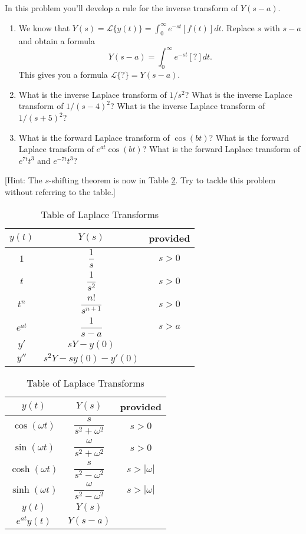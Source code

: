 \begin{problem}
 In this problem you'll develop a rule for the inverse transform of $Y(s-a)$. 
\begin{enumerate}
 \item  We know that $Y(s) = \mathscr{L}\{y(t)\} = \int_0^\infty e^{-st}[f(t)]dt$.  Replace $s$ with $s-a$ and obtain a formula
$$Y(s-a) = \int_0^\infty e^{-st}[?] dt.$$ This gives you a formula $\mathscr{L}\{?\} = Y(s-a)$.
 \item What is the inverse Laplace transform of $1/s^2$?  What is the inverse Laplace transform of $1/(s-4)^2$? What is the inverse Laplace transform of $1/(s+5)^2$?
 \item What is the forward Laplace transform of $\cos(bt)$? What is the forward Laplace transform of $e^{at} \cos (bt)$? What is the forward Laplace transform of $e^{7t}t^3$ and $e^{-7t}t^3$?
\end{enumerate}
[Hint: The $s$-shifting theorem is now in Table \ref{laplacetable2}.  Try to tackle this problem without referring to the table.]
\end{problem}

\begin{table}
\begin{center}
\begin{tabular}[t]{|c|cc|}
\hline
$y(t)$ & $Y(s)$ & provided\\
\hline\hline
$1$					&$\dfrac{1}{s}$ 							&$s>0$\\\hline
$t$				&$\dfrac{1}{s^{2}}$ 			&$s>0$\\\hline
$t^n$				&$\dfrac{n!}{s^{n+1}}$ 			&$s>0$\\\hline
$e^{at}$		&$\dfrac{1}{s-a}$ 			&$s>a$\\\hline
$y'$					&$sY-y(0)$ 						&\\\hline
$y''$					&$s^2Y-sy(0)-y'(0)$ 						&\\\hline
\end{tabular}
\quad
\begin{tabular}[t]{|c|cc|}
\hline
$y(t)$ & $Y(s)$ & provided\\
\hline\hline
$\cos(\omega t)$  &$\dfrac{s}{s^2+\omega^2}$ 			&$s>0$\\\hline
$\sin(\omega t)$  &$\dfrac{\omega}{s^2+\omega^2}$ 			&$s>0$\\\hline
$\cosh(\omega t)$ &$\dfrac{s}{s^2-\omega^2}$ 			&$s>|\omega|$\\\hline
$\sinh(\omega t)$ &$\dfrac{\omega}{s^2-\omega^2}$ 			&$s>|\omega|$\\\hline
$y(t)$  &$Y(s)$ 						&\\\hline
$e^{at}y(t)$  &$Y(s-a)$ 						&\\\hline
\end{tabular}

\caption{Table of Laplace Transforms}
\label{laplacetable2}
\end{center}
\end{table}


